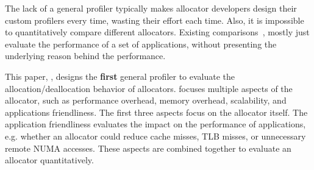 The lack of a general profiler typically makes  allocator developers design their custom profilers every time, wasting their effort each time. Also, it is impossible to quantitatively compare different allocators. Existing comparisons~\cite{Barroso:1998:MSC:279358.279363, Masmano:2006:CMA:1167999.1168012, ferreira2011experimental}, mostly just evaluate the performance of a set of applications, without presenting the underlying reason behind the performance. 


This paper, \MP{}, designs the \textbf{first} general profiler to evaluate the allocation/deallocation behavior of allocators. \MP{} focuses multiple aspects of the allocator, such as performance overhead, memory overhead, scalability, and applications friendliness. The first three aspects focus on the allocator itself. The application friendliness evaluates the impact on the performance of applications, e.g. whether an allocator could reduce cache misses, TLB misses, or unnecessary remote NUMA accesses. These aspects are combined together to evaluate an allocator quantitatively. 

